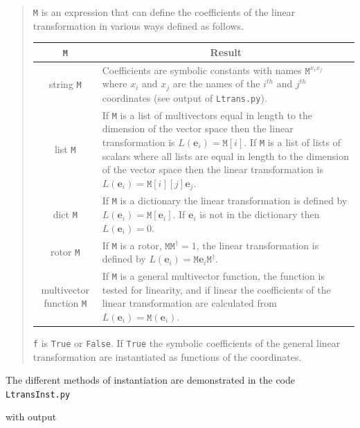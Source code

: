 \documentclass[12pt]{report}
\newcommand{\bm}[1]{\boldsymbol{#1}}
\newcommand{\ebf}{\bm{e}}
\newcommand{\mat}[1]{\left [ {#1} \right ]}
\newcommand{\lp}{\left (}
\newcommand{\rp}{\right )}
\newcommand{\R}{\dagger}
\newcommand{\f}[2]{{#1}\lp {#2} \rp}
\newcommand{\T}[1]{\texttt{#1}}
\newcommand{\includecode}[1]{}
\begin{document}
\begin{quote}
    \T{M} is an expression that can define the coefficients of the linear transformation in various ways defined as follows.
    \begin{center}
    \begin{longtable}{cl}
    \T{M} &  \multicolumn{1}{c}{Result} \\ \hline
    string \T{M} & \parbox[t]{4in}{Coefficients are symbolic constants with names $\T{M}^{x_{i}x_{j}}$ where $x_{i}$
                       and $x_{j}$ are the names
    of the $i^{th}$ and $j^{th}$ coordinates (see output of \T{Ltrans.py}). } \\ \hline
    list \T{M} & \parbox[t]{4in}{If \T{M} is a list of multivectors equal in length to the dimension of the vector space then
                 the linear transformation is $\f{L}{\ebf_{i}} = \T{M}\mat{i}$. If \T{M} is a list of lists of scalars where all
                 lists are equal in length to the dimension of the vector space then the linear transformation is
                 $\f{L}{\ebf_{i}} = \T{M}\mat{i}\mat{j}\ebf_{j}$.} \\ \hline
    dict \T{M} & \parbox[t]{4in}{If \T{M} is a dictionary the linear transformation is defined by
                 $\f{L}{\ebf_{i}} = \T{M}\mat{\ebf_{i}}$. If $\ebf_{i}$ is not in the dictionary then $\f{L}{\ebf_{i}} =0$.} \\ \hline
    rotor \T{M} & \parbox[t]{4in}{If \T{M} is a rotor, $\T{M}\T{M}^{\R}=1$, the linear transformation is defined by
                   $\f{L}{\ebf_{i}} = \T{M}\ebf_{i}\T{M}^{\R}$.} \\ \hline
    multivector function \T{M} & \parbox[t]{4in}{If \T{M} is a general multivector function, the function is tested for linearity, and if
                                 linear the coefficients of the linear transformation are calculated from
                                 $\f{L}{\ebf_{i}} = \f{\T{M}}{\ebf_{i}}$.} \\ \hline
    \end{longtable}
    \end{center}
    \vspace{-0.5in}\T{f} is \T{True} or \T{False}. If \T{True} the symbolic coefficients of the general linear transformation are instantiated as functions of the coordinates.
\end{quote}
The different methods of instantiation are demonstrated in the code \T{LtransInst.py}
\includecode{python/LtransInst.py}
with output
\end{document}
